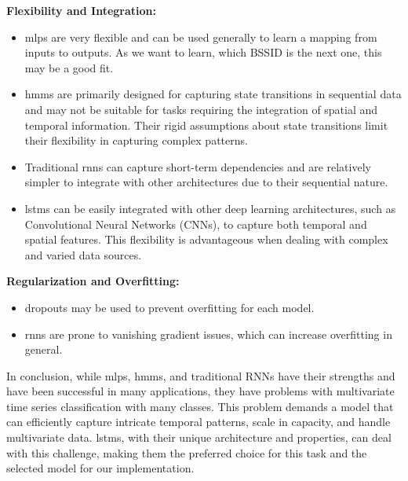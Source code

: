 \textbf{Flexibility and Integration:}
\begin{itemize}
    \item \acp{mlp} are very flexible and can be used generally to learn a mapping from inputs to outputs. \cite{mlp-vs-cnn-vs-rnn} As we want to learn, which BSSID is the next one, this may be a good fit.
    \item \acp{hmm} are primarily designed for capturing state transitions in sequential data and may not be suitable for tasks requiring the integration of spatial and temporal information. Their rigid assumptions about state transitions limit their flexibility in capturing complex patterns. \cite{hmm-rabiner-1989}
    \item Traditional \acp{rnn} can capture short-term dependencies and are relatively simpler to integrate with other architectures due to their sequential nature.
    \item \acp{lstm} can be easily integrated with other deep learning architectures, such as Convolutional Neural Networks (CNNs), to capture both temporal and spatial features. This flexibility is advantageous when dealing with complex and varied data sources.
\end{itemize}

\textbf{Regularization and Overfitting:}
\begin{itemize}
    \item dropouts may be used to prevent overfitting for each model\cite{srivastava14a}.
    \item \acp{rnn} are prone to vanishing gradient issues, which can increase overfitting in general. \cite{rnn_difficulties_2013}
\end{itemize}




In conclusion, while \acp{mlp}, \acp{hmm}, and traditional RNNs have their strengths and have been successful in many applications, they have problems with multivariate time series classification with many classes.
This problem demands a model that can efficiently capture intricate temporal patterns, scale in capacity, and handle multivariate data.
\acp{lstm}, with their unique architecture and properties, can deal with this challenge, making them the preferred choice for this task and the selected model for our implementation.


